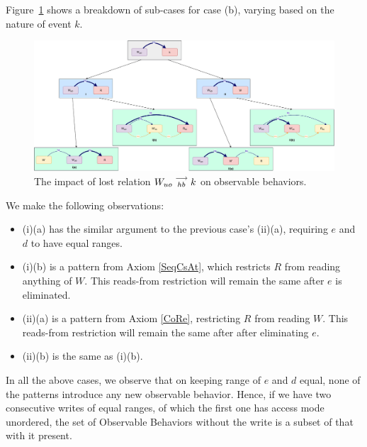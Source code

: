    Figure~\ref{elim_write:case2} shows a breakdown of sub-cases for case (b), varying based
    on the nature of event $k$.
    \begin{figure}[H]
        \centering
        \includegraphics[scale=0.3]{5.Elimination/1.ValidEliminationCandidate/WriteElimProof/ProofParts/Part4Case2.pdf}
        \caption{The impact of lost relation $W_{uo}\stackrel{\longrightarrow}{_{hb}}k$ on observable behaviors.}
        \label{elim_write:case2}
    \end{figure}

    We make the following observations:
    \begin{itemize}
        \item (i)(a) has the similar argument to the previous case's (ii)(a), requiring $e$ and $d$ to have equal ranges.
        \item (i)(b) is a pattern from Axiom \ref{SeqCsAt}, which restricts $R$ from reading anything of $W$. This reads-from restriction will remain the same after $e$ is eliminated. 
        \item (ii)(a) is a pattern from Axiom \ref{CoRe}, restricting $R$ from reading $W$. This reads-from restriction will remain the same after after eliminating $e$.
        \item (ii)(b) is the same as (i)(b).
    \end{itemize}

    In all the above cases, we observe that on keeping range of $e$ and $d$ equal, none of the patterns introduce any new observable behavior. Hence, if we have two consecutive writes of equal ranges, of which the first one has access mode unordered, the set of Observable Behaviors without the write is a subset of that with it present. 